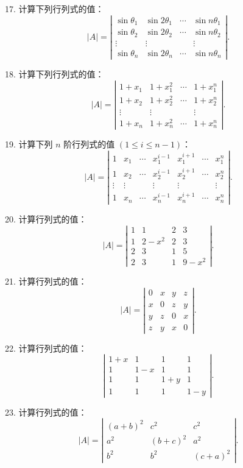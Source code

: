 \documentclass[UTF8,12pt,a4paper,fontset=fandol]{ctexart}
\begin{document}
17. 计算下列行列式的值：
\[
|A|=
\left|\begin{array}{cccc}
\sin\theta_1&\sin2\theta_1&\cdots&\sin n\theta_1\\
\sin\theta_2&\sin2\theta_2&\cdots&\sin n\theta_2\\
\vdots&\vdots&&\vdots\\
\sin\theta_n&\sin2\theta_n&\cdots&\sin n\theta_n
\end{array}\right|.
\]

18. 计算下列行列式的值：
\[
|A|=
\left|\begin{array}{cccc}
1+x_1&1+x_1^2&\cdots&1+x_1^n\\
1+x_2&1+x_2^2&\cdots&1+x_2^n\\
\vdots&\vdots&&\vdots\\
1+x_n&1+x_n^2&\cdots&1+x_n^n
\end{array}\right|.
\]

19. 计算下列 $n$ 阶行列式的值 $(1\le i\le n-1)$：
\[
|A|=
\left|\begin{array}{ccccccc}
1&x_1&\cdots&x_1^{i-1}&x_1^{i+1}&\cdots&x_1^n\\
1&x_2&\cdots&x_2^{i-1}&x_2^{i+1}&\cdots&x_2^n\\
\vdots&\vdots&&\vdots&\vdots&&\vdots\\
1&x_n&\cdots&x_n^{i-1}&x_n^{i+1}&\cdots&x_n^n
\end{array}\right|.
\]

20. 计算行列式的值：
\[
|A|=
\left|\begin{array}{rrrr}
1&1&2&3\\
1&2-x^2&2&3\\
2&3&1&5\\
2&3&1&9-x^2
\end{array}\right|.
\]

21. 计算行列式的值：
\[
|A|=
\left|\begin{array}{rrrr}
0&x&y&z\\
x&0&z&y\\
y&z&0&x\\
z&y&x&0
\end{array}\right|.
\]

22. 计算行列式的值：
\[
\left|\begin{array}{rrrr}
1+x&1&1&1\\
1&1-x&1&1\\
1&1&1+y&1\\
1&1&1&1-y
\end{array}\right|.
\]

23. 计算行列式的值：
\[
|A|=
\left|\begin{array}{ccc}
(a+b)^2&c^2&c^2\\
a^2&(b+c)^2&a^2\\
b^2&b^2&(c+a)^2
\end{array}\right|.
\]
\end{document}
